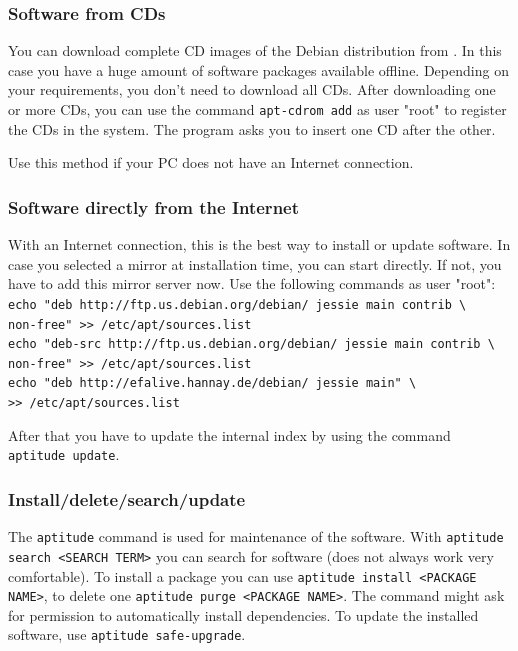 \documentclass[a4paper,12pt,twoside]{article}
\begin{document}
\subsubsection{Software from CDs}
\label{sct:software_cd}
You can download complete CD images of the Debian distribution from
\cite{DEB4}. In this case you have a huge amount of software packages
available offline. Depending on your requirements, you
don't need to download all CDs. After downloading one
or more CDs, you can use the command \texttt{apt-cdrom
add} as user "root" to
register the CDs in the system. The program asks you to insert one CD
after the other.

Use this method if your PC does not have an Internet connection.


\subsubsection{Software directly from the Internet}
\label{sct:software_internet}
With an Internet connection, this is the best way to install or update
software. In case you selected a mirror at installation time, you can
start directly. If not, you have to add this mirror server now. Use the
following commands as user "root":
\bigskip
\\
\texttt{echo "deb http://ftp.us.debian.org/debian/ jessie main contrib \textbackslash\\
    non-free"\ {\textgreater}{\textgreater} /etc/apt/sources.list}
\\
\texttt{echo "deb-src http://ftp.us.debian.org/debian/ jessie main contrib \textbackslash\\
    non-free"\ {\textgreater}{\textgreater} /etc/apt/sources.list}
\\
\texttt{echo "deb http://efalive.hannay.de/debian/ jessie main" \textbackslash\\
    {\textgreater}{\textgreater} /etc/apt/sources.list}

\bigskip
After that you have to update the internal index by using the command
\texttt{aptitude update}.


\subsubsection{Install/delete/search/update}
\label{sct:software_management}
The \texttt{aptitude} command is used for maintenance
of the software. With \texttt{aptitude search {\textless}SEARCH
TERM{\textgreater}} you can search for software (does not
always work very comfortable). To install a package you can use
\texttt{aptitude install {\textless}PACKAGE
NAME{\textgreater}}, to delete one
\texttt{aptitude purge {\textless}PACKAGE
NAME{\textgreater}}. The command might ask for permission
to automatically install dependencies. To update the installed
software, use \texttt{aptitude safe-upgrade}.
\end{document}
